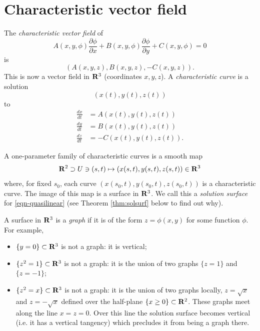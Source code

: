 \section{Characteristic vector field}

\begin{dfn}
The {\em characteristic vector field} of
\[A(x,y,\phi)\frac{\partial\phi}{\partial x}+B(x,y,\phi)\frac{\partial\phi}{\partial y}+C(x,y,\phi)=0\]
is
\[(A(x,y,z),B(x,y,z),-C(x,y,z)).\]
This is now a vector field in $\mathbf{R}^3$ (coordinates $x,y,z$). A {\em characteristic curve} is a solution
\[(x(t),y(t),z(t))\]
to
\begin{align*}
\frac{dx}{dt}&=A(x(t),y(t),z(t))\\
\frac{dy}{dt}&=B(x(t),y(t),z(t))\\
\frac{dz}{dt}&=-C(x(t),y(t),z(t)).
\end{align*}
\end{dfn}

\begin{dfn}
A one-parameter family of characteristic curves is a smooth map
\[\mathbf{R}^2\supset U\ni(s,t)\mapsto(x(s,t),y(s,t),z(s,t))\in\mathbf{R}^3\]
where, for fixed $s_0$, each curve $(x(s_0,t),y(s_0,t),z(s_0,t))$ is a characteristic curve. The image of this map is a surface in $\mathbf{R}^3$. We call this a {\em solution surface} for \eqref{eqn-quasilinear} (see Theorem \ref{thm:solsurf} below to find out why).
\end{dfn}

\begin{dfn}
A surface in $\mathbf{R}^3$ is a {\em graph} if it is of the form $z=\phi(x,y)$ for some function $\phi$. For example,
\begin{itemize}
\item $\{y=0\}\subset\mathbf{R}^3$ is not a graph: it is vertical;
\item $\{z^2=1\}\subset\mathbf{R}^3$ is not a graph: it is the union of two graphs $\{z=1\}$ and $\{z=-1\}$;
\item $\{z^2=x\}\subset\mathbf{R}^3$ is not a graph: it is the union of two graphs locally, $z=\sqrt{x}$ and $z=-\sqrt{x}$ defined over the half-plane $\{x\geq 0\}\subset\mathbf{R}^2$. These graphs meet along the line $x=z=0$. Over this line the solution surface becomes vertical (i.e. it has a vertical tangency) which precludes it from being a graph there.
\end{itemize}
\end{dfn}

